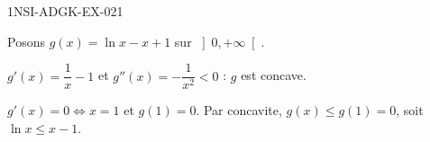 \begin{corrige}{1NSI-ADGK-EX-021}

Posons $g(x) = \ln x - x + 1$ sur $\left]0, +\infty\right[$.


$g'(x) = \dfrac{1}{x} - 1$ et $g''(x) = -\dfrac{1}{x^2} < 0$ : $g$ est concave.

$g'(x) = 0 \iff x = 1$ et $g(1) = 0$. Par concavite, $g(x) \leq g(1) = 0$, soit $\ln x \leq x - 1$.

\end{corrige}
